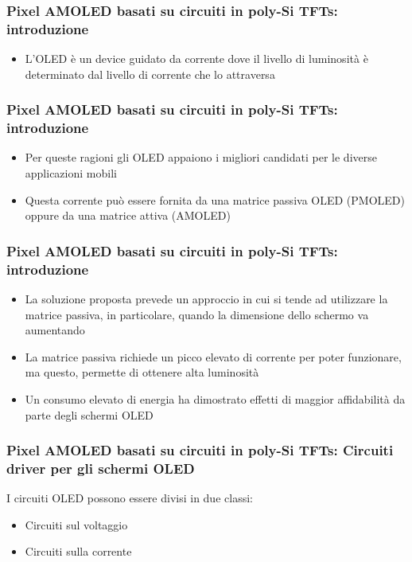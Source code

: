 \documentclass[12pt]{beamer}
\begin{document}
	\begin{frame}
		\frametitle{Pixel AMOLED basati su circuiti in poly-Si TFTs: introduzione}
		\begin{itemize}
			\item L’OLED è un device guidato da corrente dove il livello di luminosità è determinato dal livello di corrente che lo attraversa
		\end{itemize}
	\end{frame}
	\begin{frame}
		\frametitle{Pixel AMOLED basati su circuiti in poly-Si TFTs: introduzione}
		\begin{itemize}
			\item Per queste ragioni gli OLED appaiono i migliori candidati per le diverse applicazioni mobili
			\pause
			\item Questa corrente può essere fornita da una matrice passiva OLED (PMOLED) oppure da una matrice attiva (AMOLED)
		\end{itemize}
	\end{frame}
	\begin{frame}
		\frametitle{Pixel AMOLED basati su circuiti in poly-Si TFTs: introduzione}
		\begin{itemize}
			\item La soluzione proposta prevede un approccio in cui si tende ad utilizzare la matrice passiva, in particolare, quando la dimensione dello schermo va aumentando
			\pause
			\item La matrice passiva richiede un picco elevato di corrente per poter funzionare, ma questo, permette di ottenere alta luminosità
			\pause
			\item Un consumo elevato di energia ha dimostrato effetti di maggior affidabilità da parte degli schermi OLED
		\end{itemize}
	\end{frame}
	\begin{frame}
		\frametitle{Pixel AMOLED basati su circuiti in poly-Si TFTs: Circuiti driver per gli schermi OLED}
		I circuiti OLED possono essere divisi in due classi:
		\begin{itemize}
			\item Circuiti sul voltaggio
			\pause
			\item Circuiti sulla corrente
		\end{itemize}
	\end{frame}
\end{document}
